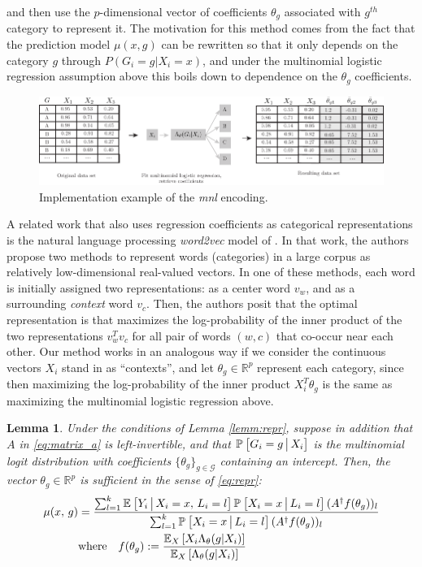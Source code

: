 \documentclass{article}
\theoremstyle{plain}
\newtheorem{lemm}[prop]{Lemma}
\theoremstyle{definition}
\theoremstyle{remark}
\begin{document}
\noindent and then use the $p$-dimensional vector of coefficients $\theta_{g}$ associated with $g^{th}$ category to represent it. The motivation for this method comes from the fact that the prediction model $\mu(x, g)$ can be rewritten so that it only depends on the category $g$ through $P(G_{i}=g|X_{i}=x)$, and under the  multinomial logistic regression assumption above this boils down to dependence on the $\theta_{g}$ coefficients.

\begin{figure}[H]
  \centering
  \includegraphics[width=\textwidth]{figures/mnl.pdf}
  \caption{Implementation example of the \emph{mnl} encoding.}
  \label{fig:mnl_encoding}
\end{figure}


A related work that also uses regression coefficients as categorical representations is the natural language processing \emph{word2vec} model of \cite{mikolov2013efficient}. In that work, the authors propose two methods to represent words (categories) in a large corpus as relatively low-dimensional real-valued vectors. In one of these methods, each word is initially assigned two representations: as a center word $v_{w}$, and as a surrounding \emph{context} word $v_{c}$. Then, the authors posit that the optimal representation is that maximizes the log-probability of the inner product of the two representations $v_{w}^{T}v_{c}$ for all pair of words $(w, c)$ that co-occur near each other. Our method works in an analogous way if we consider the continuous vectors $X_{i}$ stand in as ``contexts'', and let $\theta_{g} \in \mathbb{R}^{p}$ represent each category, since then maximizing the log-probability of the inner product $X_{i}^{T}\theta_{g}$ is the same as maximizing the multinomial logistic regression above.


\begin{lemm}
\label{lemm:mnl}
Under the conditions of Lemma \ref{lemm:repr}, suppose in addition that $A$ in \eqref{eq:matrix_a} is left-invertible, and that $\PP{ G_{i}=g \cond X_{i}}$ is the multinomial logit distribution with coefficients $\{\theta_{g} \}_{g \in \mathcal{G}}$ containing an intercept. Then, the vector $\theta_{g} \in \mathbb{R}^{p}$ is sufficient in the sense of \eqref{eq:repr}:
\begin{align}
\mu(x, \, g) &= \frac{\sum_{l = 1}^k  \EE{Y_i \cond X_i = x, \, L_i = l} \PP{X_i = x \cond L_i = l} (A^\dagger f(\theta_g))_l}
                     {\sum_{l = 1}^k \PP{X_i = x \cond L_i = l} (A^\dagger f(\theta_{g}))_{l} } \\
&\text{where} \quad f(\theta_{g}) := \frac{\EE[X]{ X_{i}\Lambda_{\theta}(g|X_{i})}}{\EE[X]{\Lambda_{\theta}(g|X_{i})}}
\end{align}
\end{lemm}
\end{document}
